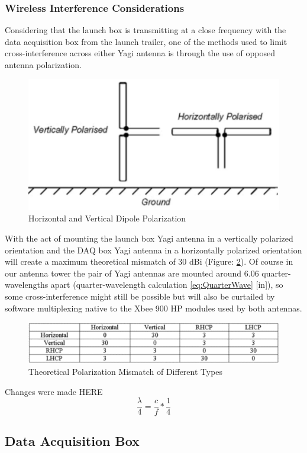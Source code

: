 \documentclass[10pt,a4paper]{article}
\begin{document}
\subsubsection{Wireless Interference Considerations} \label{PolarizationMismatch}
 Considering that the launch box is transmitting at a close frequency with the data acquisition box from the launch trailer, one of the methods used to limit cross-interference across either Yagi antenna is through the use of opposed antenna polarization.
\begin{figure}[h!]
	\centering
	\includegraphics[width=.35\textwidth]{./figs/AntennaPolarization.jpg}
	\caption{Horizontal and Vertical Dipole Polarization}
	\label{fig:polarization}
\end{figure}
With the act of mounting the launch box Yagi antenna in a vertically polarized orientation and the DAQ box Yagi antenna in a horizontally polarized orientation will create a maximum theoretical mismatch of 30 dBi (Figure: \ref{fig:Mismatch}). Of course in our antenna tower the pair of Yagi antennas are mounted around 6.06 quarter-wavelengths apart (quarter-wavelength calculation \ref{eq:QuarterWave} [in]), so some cross-interference might still be possible but will also be curtailed by software multiplexing native to the Xbee 900 HP modules used by both antennas.
\begin{figure}[h!]
	\centering
	\includegraphics[width=.6\textwidth]{./figs/PolarizationTable.png}
	\caption{Theoretical Polarization Mismatch of Different Types}
	\label{fig:Mismatch}
\end{figure}
Changes were made HERE
\begin{equation}
	\frac{\lambda}{4}= \frac{c}{f}*\frac{1}{4}
	\label{eq:QuarterWave}
\end{equation}


\subsection{Data Acquisition Box}
\end{document}

